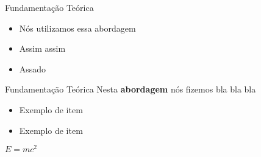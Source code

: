 \begin{frame}{Fundamentação Teórica}
\begin{itemize}
    \item Nós utilizamos essa abordagem
    \item Assim assim
    \item Assado
\end{itemize}
    
\end{frame}

\begin{frame}{Fundamentação Teórica}
Nesta \textbf{abordagem} nós fizemos bla bla bla
\medskip

\begin{itemize}
    \item Exemplo de item
    \medskip
    \item Exemplo de item
\end{itemize}    
\medskip

\begin{theorem}
$E = mc^2$
\end{theorem}

\end{frame}